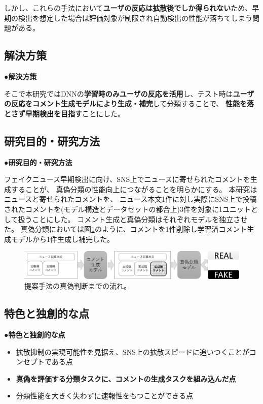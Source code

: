 {	しかし、これらの手法において\textbf{ユーザの反応は拡散後でしか得られない}ため、早期の検出を想定した場合は評価対象が制限され自動検出の性能が落ちてしまう問題がある。

	\subsection{解決方策}
	\noindent
	●\textbf{解決方策}

	そこで本研究ではDNNの\textbf{学習時のみユーザの反応を活用}し、テスト時は\textbf{ユーザの反応をコメント生成モデルにより生成・補完}して分類することで、
	\textbf{性能を落とさず早期検出を目指す}ことにした。

	\subsection{研究目的・研究方法}
	\noindent
	●\textbf{研究目的・研究方法}

	フェイクニュース早期検出に向け、SNS上でニュースに寄せられたコメントを生成することが、
	真偽分類の性能向上につながることを明らかにする。
	本研究はニュースと寄せられたコメントを、
	ニュース本文1件に対し実際にSNS上で投稿されたコメントを(モデル構造とデータセットの都合上)3件を対象に1ユニットとして扱うことにした。
	コメント生成と真偽分類はそれぞれモデルを独立させた。
	真偽分類においては図\ref{fig:model}のように、コメントを1件削除し学習済コメント生成モデルから1件生成し補完した。
	
	\begin{figure}[ht]
		\centering
		\includegraphics[width=0.95\linewidth]{figs/model.pdf}
		\vspace*{-3mm}
		\caption{提案手法の真偽判断までの流れ。}
		\label{fig:model}
	\end{figure}
	\vspace*{-4mm}
	\subsection{特色と独創的な点}
	\noindent
	●\textbf{特色と独創的な点}
	\vspace*{-3mm}
	\begin{itemize}
		\setlength{\parskip}{0cm}
		\setlength{\itemsep}{0cm}
		\item 拡散抑制の実現可能性を見据え、SNS上の拡散スピードに追いつくことがコンセプトである点
		\item \textbf{真偽を評価する分類タスクに、コメントの生成タスクを組み込んだ点}
		\item 分類性能を大きく失わずに速報性をもつことができる点
	\end{itemize}
	\vspace*{-2mm}

}

